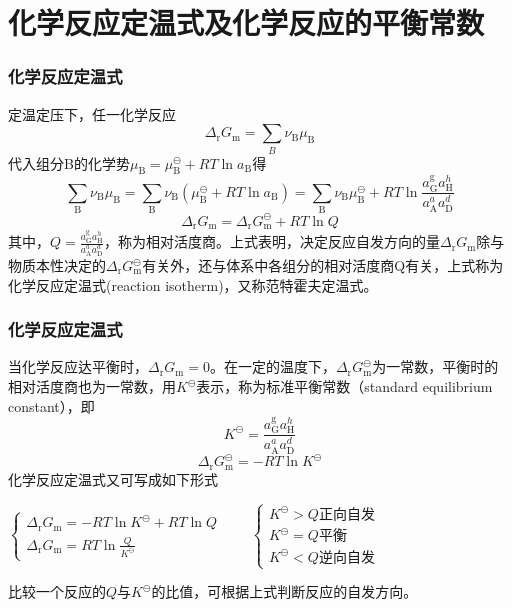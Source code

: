 \section{化学反应定温式及化学反应的平衡常数}


\begin{frame}
    \frametitle{化学反应定温式}

    定温定压下，任一化学反应
    \[
        \Delta _\mathrm{r}G_\mathrm{m}=\sum_B{\nu_\mathrm{B}\mu_\mathrm{B}}
    \]
    代入组分B的化学势$\mu_\mathrm{B}=\mu_\mathrm{B}^\ominus +RT \ln a_\mathrm{B}$得
    \[
        \sum_{\mathrm{B}} \nu_{\mathrm{B}} \mu_{\mathrm{B}}=\sum_{\mathrm{B}} \nu_{\mathrm{B}}\left(\mu_{\mathrm{B}}^{\ominus}+R T \ln a_{\mathrm{B}}\right)=\sum_{\mathrm{B}} \nu_{\mathrm{B}} \mu_{\mathrm{B}}^{\ominus}+R T \ln \frac{a_{\mathrm{G}}^{\mathrm{g}} a_{\mathrm{H}}^{h}}{a_{\mathrm{A}}^{a} a_{\mathrm{D}}^{d}}
    \]
    \[
        \Delta _\mathrm{r}G_\mathrm{m}=\Delta _\mathrm{r}G_\mathrm{m}^\ominus + RT \ln Q
    \]
    其中，$Q=\frac{a_{\mathrm{G}}^{\mathrm{g}} a_{\mathrm{H}}^{h}}{a_{\mathrm{A}}^{a} a_{\mathrm{D}}^{d}}$，称为相对活度商。上式表明，决定反应自发方向的量$\Delta _\mathrm{r}G_\mathrm{m}$除与物质本性决定的$\Delta _\mathrm{r}G_\mathrm{m}^\ominus$有关外，还与体系中各组分的相对活度商Q有关，上式称为化学反应定温式(reaction isotherm)，又称范特霍夫定温式。

\end{frame}


\begin{frame}
    \frametitle{化学反应定温式}

    当化学反应达平衡时，$\Delta _\mathrm{r}G_\mathrm{m}=0$。在一定的温度下，$\Delta _\mathrm{r}G_\mathrm{m}^\ominus$为一常数，平衡时的相对活度商也为一常数，用$K^\ominus$表示，称为标准平衡常数（standard equilibrium constant），即
    \[
        K^\ominus = \frac{a_{\mathrm{G}}^{\mathrm{g}} a_{\mathrm{H}}^{h}}{a_{\mathrm{A}}^{a} a_{\mathrm{D}}^{d}}
    \]
    \[
        \Delta _\mathrm{r}G_\mathrm{m}^\ominus = -RT \ln K^\ominus
    \]
    化学反应定温式又可写成如下形式

        $\begin{cases}
        \Delta_{\mathrm{r}} G_{\mathrm{m}}=-R T \ln K^{\ominus}+R T \ln Q \\
        \Delta_{\mathrm{r}} G_{\mathrm{m}}=R T \ln \frac{Q}{K^{\ominus}}
        \end{cases}\qquad
        \begin{cases}
            K^{\ominus} > Q \text{正向自发}\\
            K^{\ominus} = Q \text{平衡}\\
            K^{\ominus} < Q \text{逆向自发}
        \end{cases}$
    
    比较一个反应的$Q$与$K^{\ominus}$的比值，可根据上式判断反应的自发方向。

\end{frame}


